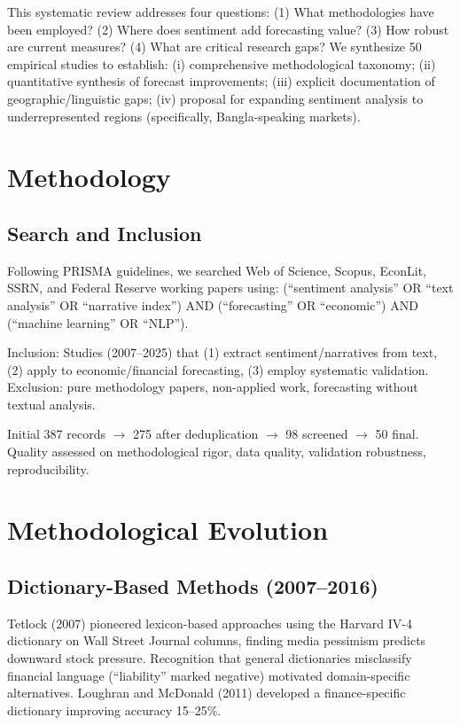 \documentclass[11pt]{article}
\begin{document}
This systematic review addresses four questions: (1) What methodologies have been employed? (2) Where does sentiment add forecasting value? (3) How robust are current measures? (4) What are critical research gaps? We synthesize 50 empirical studies to establish: (i) comprehensive methodological taxonomy; (ii) quantitative synthesis of forecast improvements; (iii) explicit documentation of geographic/linguistic gaps; (iv) proposal for expanding sentiment analysis to underrepresented regions (specifically, Bangla-speaking markets).

\section{Methodology}

\subsection{Search and Inclusion}

Following PRISMA guidelines, we searched Web of Science, Scopus, EconLit, SSRN, and Federal Reserve working papers using: (``sentiment analysis'' OR ``text analysis'' OR ``narrative index'') AND (``forecasting'' OR ``economic'') AND (``machine learning'' OR ``NLP''). 

Inclusion: Studies (2007--2025) that (1) extract sentiment/narratives from text, (2) apply to economic/financial forecasting, (3) employ systematic validation. Exclusion: pure methodology papers, non-applied work, forecasting without textual analysis.

Initial 387 records $\to$ 275 after deduplication $\to$ 98 screened $\to$ 50 final. Quality assessed on methodological rigor, data quality, validation robustness, reproducibility.

\section{Methodological Evolution}

\subsection{Dictionary-Based Methods (2007--2016)}

Tetlock (2007) pioneered lexicon-based approaches using the Harvard IV-4 dictionary on Wall Street Journal columns, finding media pessimism predicts downward stock pressure. Recognition that general dictionaries misclassify financial language (``liability'' marked negative) motivated domain-specific alternatives. Loughran and McDonald (2011) developed a finance-specific dictionary improving accuracy 15--25\%.
\end{document}
